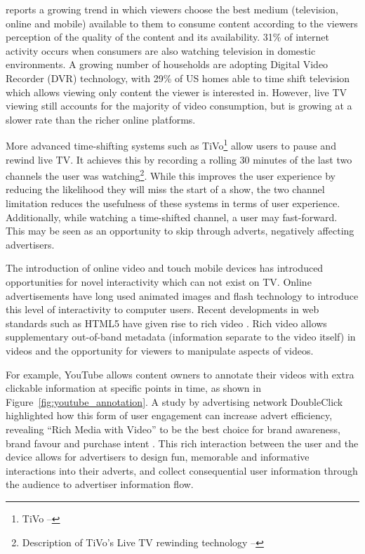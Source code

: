	\citet{three-screen} reports a growing trend in which viewers choose the best medium (television, online and mobile) available to them to consume content according to the viewers perception of the quality of the content and its availability. 31\% of internet activity occurs when consumers are also watching television in domestic environments. A growing number of households are adopting Digital Video Recorder (DVR) technology, with 29\% of US homes able to time shift television which allows viewing only content the viewer is interested in. However, live TV viewing still accounts for the majority of video consumption, but is growing at a slower rate than the richer online platforms.

	More advanced time-shifting systems such as TiVo\footnote{TiVo -- } allow users to pause and rewind live TV. It achieves this by recording a rolling 30 minutes of the last two channels the user was watching\footnote{Description of TiVo's Live TV rewinding technology -- }. While this improves the user experience by reducing the likelihood they will miss the start of a show, the two channel limitation reduces the usefulness of these systems in terms of user experience. Additionally, while watching a time-shifted channel, a user may fast-forward. This may be seen as an opportunity to skip through adverts, negatively affecting advertisers.

	The introduction of online video and touch mobile devices has introduced opportunities for novel interactivity which can not exist on TV. Online advertisements have long used animated images and flash technology to introduce this level of interactivity to computer users. Recent developments in web standards such as HTML5 have given rise to rich video \citep{HLS}. Rich video allows supplementary out-of-band metadata (information separate to the video itself) in videos and the opportunity for viewers to manipulate aspects of videos. 

	For example, YouTube allows content owners to annotate their videos with extra clickable information at specific points in time, as shown in Figure~\ref{fig:youtube_annotation}. A study by advertising network DoubleClick highlighted how this form of user engagement can increase advert efficiency, revealing ``Rich Media with Video'' to be the best choice for brand awareness, brand favour and purchase intent \citep{rich-video}. This rich interaction between the user and the device allows for advertisers to design fun, memorable and informative interactions into their adverts, and collect consequential user information through the audience to advertiser information flow.

